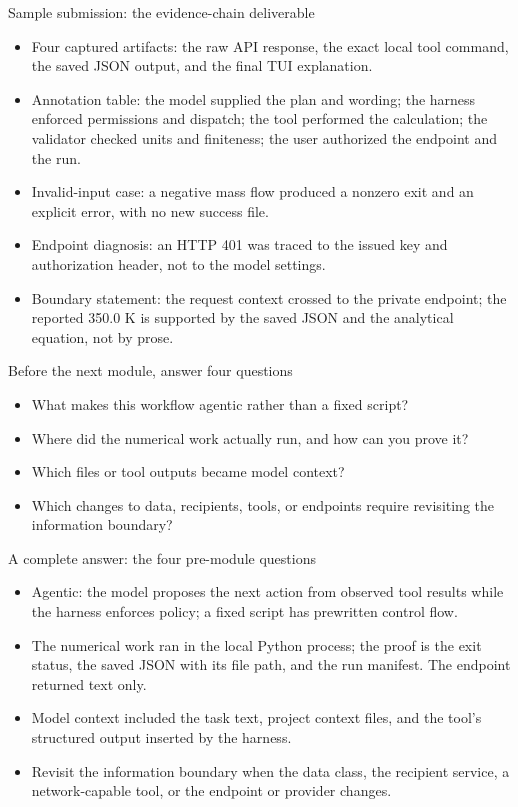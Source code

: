 \documentclass[aspectratio=169,11pt]{beamer}
\begin{document}
\begin{frame}[t,fragile]{Sample submission: the evidence-chain deliverable}
\fontsize{11.5}{14}\selectfont
\begin{itemize}\setlength{\itemsep}{2mm}
\item Four captured artifacts: the raw API response, the exact local tool command, the saved JSON output, and the final TUI explanation.
\item Annotation table: the model supplied the plan and wording; the harness enforced permissions and dispatch; the tool performed the calculation; the validator checked units and finiteness; the user authorized the endpoint and the run.
\item Invalid-input case: a negative mass flow produced a nonzero exit and an explicit error, with no new success file.
\item Endpoint diagnosis: an HTTP 401 was traced to the issued key and authorization header, not to the model settings.
\item Boundary statement: the request context crossed to the private endpoint; the reported 350.0 K is supported by the saved JSON and the analytical equation, not by prose.
\end{itemize}
\end{frame}
\begin{frame}[t,fragile]{Before the next module, answer four questions}
\fontsize{11.5}{14}\selectfont
\begin{itemize}\setlength{\itemsep}{2mm}
\item What makes this workflow agentic rather than a fixed script?
\item Where did the numerical work actually run, and how can you prove it?
\item Which files or tool outputs became model context?
\item Which changes to data, recipients, tools, or endpoints require revisiting the information boundary?
\end{itemize}
\end{frame}
\begin{frame}[t,fragile]{A complete answer: the four pre-module questions}
\fontsize{11.5}{14}\selectfont
\begin{itemize}\setlength{\itemsep}{2mm}
\item Agentic: the model proposes the next action from observed tool results while the harness enforces policy; a fixed script has prewritten control flow.
\item The numerical work ran in the local Python process; the proof is the exit status, the saved JSON with its file path, and the run manifest. The endpoint returned text only.
\item Model context included the task text, project context files, and the tool's structured output inserted by the harness.
\item Revisit the information boundary when the data class, the recipient service, a network-capable tool, or the endpoint or provider changes.
\end{itemize}
\end{frame}
\end{document}
